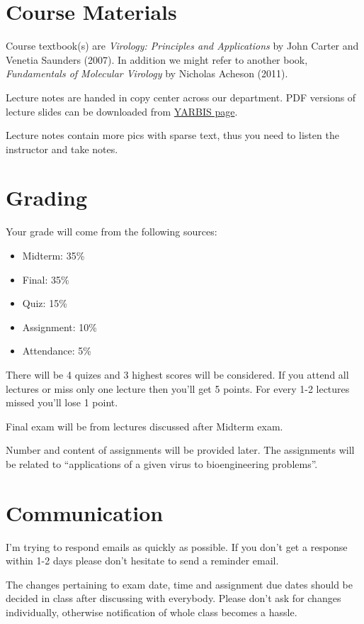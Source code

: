 \section{Course Materials}\label{course-materials}

Course textbook(s) are \emph{Virology: Principles and Applications} by
John Carter and Venetia Saunders (2007). In addition we might refer to
another book, \emph{Fundamentals of Molecular Virology} by Nicholas
Acheson (2011).

Lecture notes are handed in copy center across our department. PDF
versions of lecture slides can be downloaded from
\href{http://yarbis.yildiz.edu.tr/alyilmaz/course/viewCourse/id/6378}{YARBIS
page}.

Lecture notes contain more pics with sparse text, thus you need to
listen the instructor and take notes.

\section{Grading}\label{grading}

Your grade will come from the following sources:

\begin{itemize}
\itemsep1pt\parskip0pt
\item
  Midterm: 35\%
\item
  Final: 35\%
\item
  Quiz: 15\%
\item
  Assignment: 10\%
\item
  Attendance: 5\%
\end{itemize}

There will be 4 quizes and 3 highest scores will be considered. If you
attend all lectures or miss only one lecture then you'll get 5 points.
For every 1-2 lectures missed you'll lose 1 point.

Final exam will be from lectures discussed after Midterm exam.

Number and content of assignments will be provided later. The
assignments will be related to ``applications of a given virus to
bioengineering problems''.

\section{Communication}\label{communication}

I'm trying to respond emails as quickly as possible. If you don't get a
response within 1-2 days please don't hesitate to send a reminder email.

The changes pertaining to exam date, time and assignment due dates
should be decided in class after discussing with everybody. Please don't
ask for changes individually, otherwise notification of whole class
becomes a hassle.
